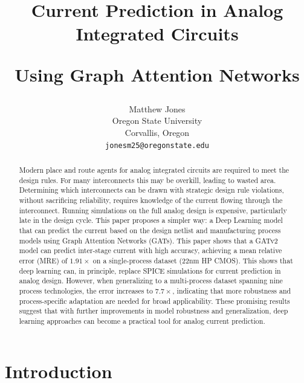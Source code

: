 \documentclass[10pt,twocolumn,letterpaper]{article}
\begin{document}
\title{Current Prediction in Analog Integrated Circuits

Using Graph Attention Networks}

\author{Matthew Jones\\
Oregon State University\\
Corvallis, Oregon\\
{\tt\small jonesm25@oregonstate.edu}
}

\maketitle

\begin{abstract}
Modern place and route agents for analog integrated circuits are required to meet the design rules. For many interconnects this may be overkill, leading to wasted area. Determining which interconnects can be drawn with strategic design rule violations, without sacrificing reliability, requires knowledge of the current flowing through the interconnect. Running simulations on the full analog design is expensive, particularly late in the design cycle. This paper proposes a simpler way: a Deep Learning model that can predict the current based on the design netlist and manufacturing process models using Graph Attention Networks (GATs).  This paper shows that a GATv2 model can predict inter-stage current with high accuracy, achieving a mean relative error (MRE) of $1.91\times$ on a single-process dataset (22nm HP CMOS). This shows that deep learning can, in principle, replace SPICE simulations for current prediction in analog design. However, when generalizing to a multi-process dataset spanning nine process technologies, the error increases to $7.7\times$, indicating that more robustness and process-specific adaptation are needed for broad applicability. These promising results suggest that with further improvements in model robustness and generalization, deep learning approaches can become a practical tool for analog current prediction.
\end{abstract}

\section{Introduction}
\label{sec:intro}
\end{document}
